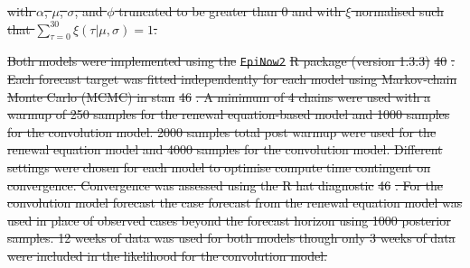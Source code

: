 \documentclass[10pt,letterpaper]{article}
\providecommand{\DIFdeltex}[1]{{\protect\color{red}\sout{#1}}}                      %
\providecommand{\DIFdel}[1]{\texorpdfstring{\DIFdeltex{#1}}{}} %
\begin{document}
\DIFdel{with \(\alpha\), \(\mu\), \(\sigma\), and \(\phi\) truncated to be
greater than 0 and with \(\xi\) normalised such that
\(\sum_{\tau = 0}^{30} \xi(\tau | \mu, \sigma) = 1\).
}%


\DIFdel{Both models were implemented using the }\texttt{\DIFdel{EpiNow2}} %
\DIFdel{R package
(version 1.3.3) }%
\DIFdel{40}%
\DIFdel{. Each forecast target was fitted independently
for each model using Markov-chain Monte Carlo (MCMC) in stan }%
\DIFdel{46}%
\DIFdel{. A
minimum of 4 chains were used with a warmup of 250 samples for the
renewal equation-based model and 1000 samples for the convolution model.
2000 samples total post warmup were used for the renewal equation model
and 4000 samples for the convolution model. Different settings were
chosen for each model to optimise compute time contingent on
convergence. Convergence was assessed using the R hat diagnostic
}%
\DIFdel{46}%
\DIFdel{. For the convolution model forecast the case forecast from the
renewal equation model was used in place of observed cases beyond the
forecast horizon using 1000 posterior samples. 12 weeks of data was used
for both models though only 3 weeks of data were included in the
likelihood for the convolution model.
}%


\end{document}

